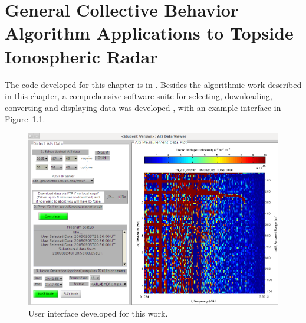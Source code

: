 \chapter{General Collective Behavior Algorithm Applications to Topside Ionospheric Radar}
\label{chapter:marsis}
\thispagestyle{myheadings}

\graphicspath{{Marsis/}}

The code developed for this chapter is in \citet{cvmarsis}.
Besides the algorithmic work described in this chapter, a comprehensive software suite for selecting, downloading, converting and displaying data was developed \citep{marsisutils}, with an example interface in Figure~\ref{fig:marsisgui}.
\begin{figure}\centering
    \includegraphics[width=0.9\linewidth]{gfx/UserGUI}
    \caption{User interface developed for this work.}\label{fig:marsisgui}
\end{figure}

